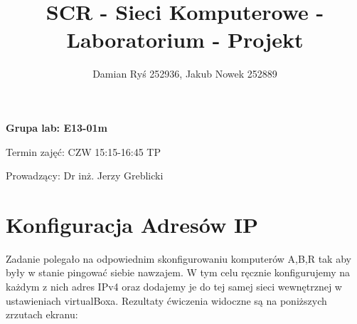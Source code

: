 \documentclass{article}
\title{SCR - Sieci Komputerowe - Laboratorium - Projekt}
\author{Damian Ryś 252936, Jakub Nowek 252889}
\begin{document}
\maketitle
\centering
\bfseries Grupa lab: E13-01m	

Termin zajęć: CZW 15:15-16:45 TP

Prowadzący: Dr inż. Jerzy Greblicki\\
\mdseries
\tableofcontents
\newpage
\justify

\section{Konfiguracja Adresów IP }
Zadanie polegało na odpowiednim skonfigurowaniu komputerów A,B,R tak aby były w stanie pingować siebie nawzajem. W tym celu
ręcznie konfigurujemy na każdym z nich adres IPv4 oraz dodajemy je do tej samej sieci wewnętrznej w ustawieniach virtualBoxa. Rezultaty ćwiczenia widoczne są na poniższych zrzutach ekranu:


\begin{figure}[H]
    \centering
    \quad
    \label{fig:my_label}
\end{figure}
\end{document}

